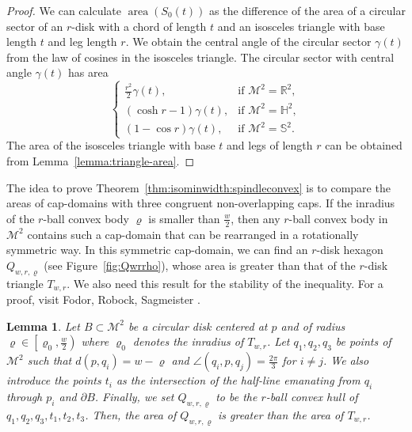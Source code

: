 \documentclass[12pt,reqno]{amsart}
\newtheorem{lemma}[theorem]{Lemma}
\theoremstyle{remark}
\newcommand{\R}{{\mathbb R}}
\newcommand{\hyp}{{\mathbb H}}
\newcommand{\sph}{{\mathbb S}}
\newcommand{\M}{\mathcal{M}}
\DeclareMathOperator{\area}{\mathrm{area}}
\begin{document}
\begin{proof}
We can calculate $\area(S_0(t))$ as the difference of the area of a circular sector of an $r$-disk with a chord of length $t$ and an isosceles triangle with base length $t$ and leg length $r$. We obtain the central angle of the circular sector $\gamma(t)$ from the law of cosines in the isosceles triangle. The circular sector with central angle $\gamma(t)$ has area
\[
\begin{cases}
\frac{r^2}{2}\gamma(t),&\text{if }\M^2=\R^2,\\
(\cosh r-1)\gamma(t),&\text{if }\M^2=\hyp^2,\\
(1-\cos r)\gamma(t),&\text{if }\M^2=\sph^2.
\end{cases}
\]
The area of the isosceles triangle with base $t$ and legs of length $r$ can be obtained from Lemma~\ref{lemma:triangle-area}.
\end{proof}

The idea to prove Theorem~\ref{thm:isominwidth:spindleconvex} is to compare the areas of cap-domains with three congruent non-overlapping caps. If the inradius of the $r$-ball convex body $\varrho$ is smaller than $\frac{w}{2}$, then any $r$-ball convex body in $\M^2$ contains such a cap-domain that can be rearranged in a rotationally symmetric way. In this symmetric cap-domain, we can find an $r$-disk hexagon $Q_{w,r,\varrho}$ (see Figure~\ref{fig:Qwrrho}), whose area is greater than that of the $r$-disk triangle $T_{w,r}$. We also need this result for the stability of the inequality. For a proof, visit Fodor, Robock, Sagmeister \cite{FRS26}.

\begin{lemma}\label{lem:areaofhexagonsincreases}
Let $B\subset\M^2$ be a circular disk centered at $p$ and of radius $\varrho\in\left[\varrho_0,\frac{w}{2}\right)$ where $\varrho_0$ denotes the inradius of $T_{w,r}$. Let $q_1,q_2,q_3$ be points of $\M^2$ such that $d\left(p,q_i\right)=w-\varrho$ and $\angle\left(q_i,p,q_j\right)=\frac{2\pi}{3}$ for $i\neq j$. We also introduce the points $t_i$ as the intersection of the half-line emanating from $q_i$ through $p_i$ and $\partial B$. Finally, we set $Q_{w,r,\varrho}$ to be the $r$-ball convex hull of $q_1,q_2,q_3,t_1,t_2,t_3$. Then, the area of $Q_{w,r,\varrho}$ is greater than the area of $T_{w,r}$.
\end{lemma}
\end{document}
